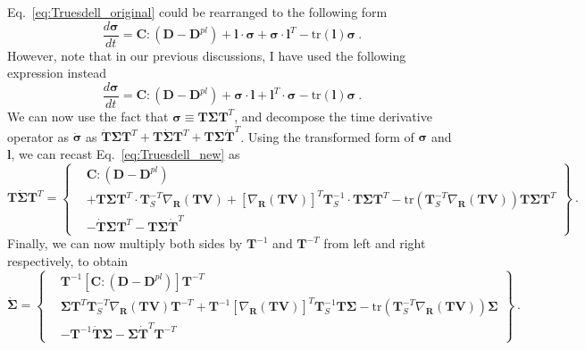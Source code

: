 \documentclass[12pt,a4paper]{article}
\begin{document}
Eq.~\eqref{eq:Truesdell_original} could be rearranged to the following form
\begin{equation}\label{eq:Truesdell_recast}
   \frac{d\bm{\sigma}}{d t} = \bm{C}:\left(\bm{D} - \bm{D}^{pl}\right) + \bm{l}\cdot\bm{\sigma} + \bm{\sigma}\cdot\bm{l}^{T} - \text{tr}\left(\bm{l}\right)\bm{\sigma}\ .
\end{equation}
However, note that in our previous discussions, I have used the following expression instead
\begin{equation}\label{eq:Truesdell_new}
   \frac{d\bm{\sigma}}{d t} = \bm{C}:\left(\bm{D} - \bm{D}^{pl}\right) + \bm{\sigma}\cdot\bm{l} + \bm{l}^{T}\cdot\bm{\sigma} - \text{tr}\left(\bm{l}\right)\bm{\sigma}\ .
\end{equation}
We can now use the fact that $\bm{\sigma}\equiv \bm{T}\bm{\Sigma}\bm{T}^{T}$, and decompose the time derivative operator as $\dot{\bm{\sigma}}$ as $ \dot{\bm{T}}\bm{\Sigma}\bm{T}^{T} + \bm{T}\dot{\bm{\Sigma}}\bm{T}^{T} + \bm{T}\bm{\Sigma}\dot{\bm{T}}^{T}$. Using the transformed form of $\bm{\sigma}$ and $\bm{l}$, we can recast Eq.~\eqref{eq:Truesdell_new} as
\begin{equation}\label{eq:Truesdell_transformed}
  \bm{T}\dot{\bm{\Sigma}}\bm{T}^{T} = \left\{\begin{split}
                                          & \bm{C}:\left(\bm{D} - \bm{D}^{pl}\right) \\
                                          & + \bm{T}\bm{\Sigma}\bm{T}^{T}\cdot \bm{T}^{-T}_S \nabla_{\bm{R}}\left(\bm{T V}\right) + \left[\nabla_{\bm{R}}\left(\bm{T V}\right)\right]^{T}\bm{T}^{-1}_S\cdot \bm{T}\bm{\Sigma}\bm{T}^{T}  - \text{tr}\left(\bm{T}^{-T}_S \nabla_{\bm{R}}\left(\bm{T V}\right)\right)\bm{T}\bm{\Sigma}\bm{T}^{T} \\
                                           &  -\dot{\bm{T}}\bm{\Sigma}\bm{T}^{T} - \bm{T}\bm{\Sigma}\dot{\bm{T}}^{T}
                                      \end{split}\right\} \ .
\end{equation}
Finally, we can now multiply both sides by $\bm{T}^{-1}$ and $\bm{T}^{-T}$ from left and right respectively, to obtain
\begin{equation}\label{eq:Truesdell_final}
  \dot{\bm{\Sigma}}= \left\{\begin{split}
                                          & \bm{T}^{-1}\left[\bm{C}:\left(\bm{D} - \bm{D}^{pl}\right)\right]\bm{T}^{-T} \\
                                          & \bm{\Sigma}\bm{T}^{T}\bm{T}^{-T}_S \nabla_{\bm{R}}\left(\bm{T V}\right)\bm{T}^{-T} + \bm{T}^{-1}\left[\nabla_{\bm{R}}\left(\bm{T V}\right)\right]^{T}\bm{T}^{-1}_S\bm{T}\bm{\Sigma}  - \text{tr}\left(\bm{T}^{-T}_S \nabla_{\bm{R}}\left(\bm{T V}\right)\right)\bm{\Sigma} \\
                                           &  -\bm{T}^{-1}\dot{\bm{T}}\bm{\Sigma} - \bm{\Sigma}\dot{\bm{T}}^{T}\bm{T}^{-T}
                                      \end{split}\right\} \ .
\end{equation}
\end{document}
